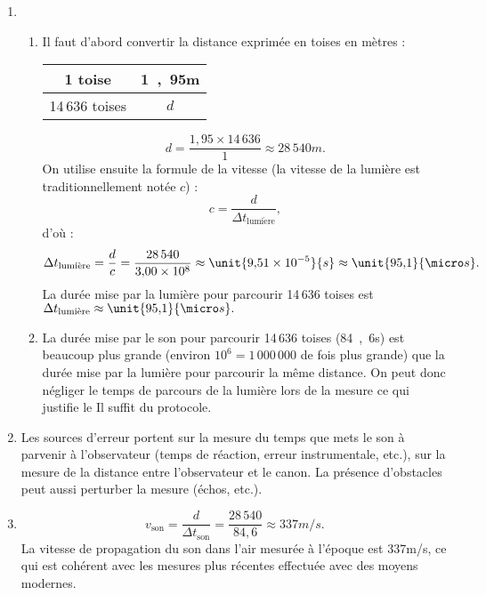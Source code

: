 \documentclass[12pt,a4paper,fleqn]{article}
\begin{document}
\begin{enumerate}
\item
\begin{enumerate}
\item Il faut d'abord convertir la distance exprimée en toises en mètres :
\begin{center}
\begin{tabular}{c|c}
1 toise & \unit{1{,}95}{m} \\
\hline
14\,636 toises & $d$
\end{tabular}
\end{center}
\[ d = \frac{1{,}95\times14\,636}{1} \approx \unit{28\,540}{m}. \]
On utilise ensuite la formule de la vitesse (la vitesse de la lumière est traditionnellement notée $c$) :
\[ c = \frac{d}{\Delta t_\mathrm{lumi\grave{e}re}}, \]
d'où :
\[ \Delta t_\mathrm{lumi\grave{e}re} = \frac{d}{c} = \frac{28\,540}{3{,}00\times 10^8} \approx \unit{9{,}51\times10^{-5}}{s} \approx \unit{95{,}1}{\micro s}. \]
La durée mise par la lumière pour parcourir 14\,636 toises est $\Delta t_\mathrm{lumi\grave{e}re} \approx \unit{95{,}1}{\micro s}.$
\item La durée mise par le son pour parcourir 14\,636 toises (\unit{84{,}6}{s}) est beaucoup plus grande (environ $10^6=1\,000\,000$ de fois plus grande) que la durée mise par la lumière pour parcourir la même distance.
On peut donc négliger le temps de parcours de la lumière lors de la mesure ce qui justifie le \og Il suffit \fg{} du protocole.
\end{enumerate}
\item Les sources d'erreur portent sur la mesure du temps que mets le son à parvenir à l'observateur (temps de réaction, erreur instrumentale, etc.), sur la mesure de la distance entre l'observateur et le canon.
La présence d'obstacles peut aussi perturber la mesure (échos, etc.).

\item
\[ v_\mathrm{son} = \frac{d}{\Delta t_\mathrm{son}} = \frac{28\,540}{84{,}6} \approx \unit{337}{m/s}. \]
La vitesse de propagation du son dans l'air mesurée à l'époque est \unit{337}{m/s}, ce qui est cohérent avec les mesures plus récentes effectuée avec des moyens modernes.
\end{enumerate}
\end{document}
